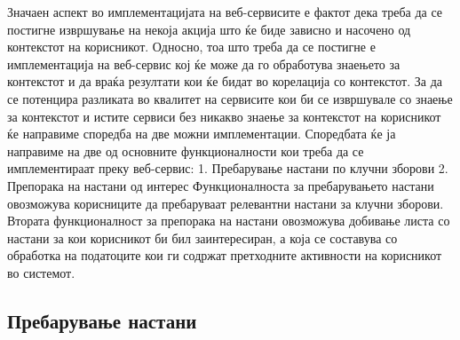 Значаен аспект во
имплементацијата на веб-сервисите е фактот дека треба да се постигне извршување
на некоја акција што ќе биде зависно и насочено од контекстот на корисникот.
Односно, тоа што треба да се постигне е имплементација на веб-сервис кој ќе може
да го обработува знаењето за контекстот и да враќа резултати кои ќе бидат во
корелација со контекстот. За да се потенцира разликата во квалитет на сервисите
кои би се извршувале со знаење за контекстот и истите сервиси без никакво знаење
за контекстот на корисникот ќе направиме споредба на две можни имплементации.
Споредбата ќе ја направиме на две од основните функционалности кои треба да се
имплементираат преку веб-сервис: 1.  Пребарување настани по клучни зборови 2. 
Препорака на настани од интерес Функционалноста за пребарувањето настани
овозможува корисниците да пребаруваат релевантни настани за клучни зборови.
Втората функционалност за препорака на настани овозможува добивање листа со
настани за кои корисникот би бил заинтересиран, а која се составува со обработка
на податоците кои ги содржат претходните активности на корисникот во системот.
  

\subsection{Пребарување настани} 


